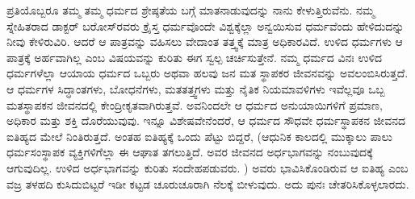 ಪ್ರತಿಯೊಬ್ಬರೂ ತಮ್ಮ ತಮ್ಮ ಧರ್ಮದ ಶ್ರೇಷ್ಠತೆಯ ಬಗ್ಗೆ ಮಾತನಾಡುವುದನ್ನು ನಾನು ಕೇಳುತ್ತಿರುವೆನು. ನಮ್ಮ ಸ್ನೇಹಿತರಾದ ಡಾಕ್ಟರ್​ ಬರೋಸ್​ರವರು ಕ್ರೈಸ್ತ ಧರ್ಮವೊಂದೇ ವಿಶ್ವಕ್ಕೆಲ್ಲಾ ಅನ್ವಯಿಸುವ ಧರ್ಮವೆಂದು ಹೇಳಿದುದನ್ನು ನೀವು ಕೇಳಿರುವಿರಿ. ಆದರೆ ಆ ಪಾತ್ರವನ್ನು ವಹಿಸಲು ವೇದಾಂತ ತತ್ತ್ವಕ್ಕೆ ಮಾತ್ರ ಅಧಿಕಾರವಿದೆ. ಉಳಿದ ಧರ್ಮಗಳು ಆ ಪಾತ್ರಕ್ಕೆ ಅರ್ಹವಾಗಿಲ್ಲ ಎಂಬ ವಿಷಯವನ್ನು ಕುರಿತು ಈಗ ಸ್ವಲ್ಪ ಚರ್ಚಿಸುತ್ತೇನೆ. ನಮ್ಮ ಧರ್ಮದ ವಿನಃ ಉಳಿದ ಧರ್ಮಗಳೆಲ್ಲಾ ಆಯಾಯ ಧರ್ಮದ ಒಬ್ಬರು ಅಥವಾ ಹಲವು ಜನ ಮತ ಸ್ಥಾಪಕರ ಜೀವನವನ್ನು ಅವಲಂಬಿಸಿರುತ್ತದೆ. ಆ ಧರ್ಮಗಳ ಸಿದ್ಧಾಂತಗಳು, ಬೋಧನೆಗಳು, ಮತತತ್ತ್ವಗಳು ಮತ್ತು ನೈತಿಕ ನಿಯಮಾವಳಿಗಳು ಇವೆಲ್ಲವೂ ಒಬ್ಬ ಮತಸ್ಥಾಪಕನ ಜೀವನದಲ್ಲಿ ಕೇಂದ್ರೀಕೃತವಾಗಿರುತ್ತವೆ. ಅವನಿಂದಲೇ ಆ ಧರ್ಮದ ಅನುಯಾಯಿಗಳಿಗೆ ಪ್ರಮಾಣ, ಅಧಿಕಾರ ಮತ್ತು ಶಕ್ತಿ ದೊರೆಯುವುವು. ಇನ್ನೂ ವಿಶೇಷವೇನೆಂದರೆ, ಆ ಧರ್ಮದ ಸೌಧವೇ ಧರ್ಮಸ್ಥಾಪಕನ ಜೀವನದ ಐತಿಹ್ಯದ ಮೇಲೆ ನಿಂತಿರುತ್ತದೆ. ಅಂತಹ ಐತಿಹ್ಯಕ್ಕೆ ಒಂದು ಪೆಟ್ಟು ಬಿದ್ದರೆ, (ಆಧುನಿಕ ಕಾಲದಲ್ಲಿ ಮುಕ್ಕಾಲು ಪಾಲು ಧರ್ಮಸಂಸ್ಥಾಪಕ ವ್ಯಕ್ತಿಗಳಿಗೆಲ್ಲಾ ಈ ಆಘಾತ ತಗಲುತ್ತಿದೆ. ಅವರ ಜೀವನದ ಅರ್ಧಭಾಗವನ್ನು ನಂಬುವುದಕ್ಕೆ ಆಗುವುದಿಲ್ಲ. ಉಳಿದ ಅರ್ಧಭಾಗವನ್ನು ಕುರಿತು ಸಂದೇಹಪಡುವರು. ) ಅವರು ಭಾವಿಸಿಕೊಂಡಿರುವ ಆ ಐತಿಹ್ಯ ಎಂಬ ವಜ್ರ ತಳಹದಿ ಕುಸಿದುಬಿಟ್ಟರೆ ಇಡೀ ಕಟ್ಟಡ ಚೂರುಚೂರಾಗಿ ನೆಲಕ್ಕೆ ಬೀಳುವುದು. ಅದು ಪುನಃ ಚೇತರಿಸಿಕೊಳ್ಳಲಾರದು. 


